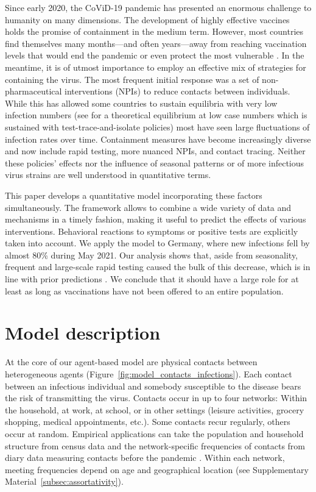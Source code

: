 Since early 2020, the CoViD-19 pandemic has presented an enormous challenge to humanity
on many dimensions. The development of highly effective vaccines holds the promise of
containment in the medium term. However, most countries find themselves many
months---and often years---away from reaching vaccination levels that would end the
pandemic or even protect the most vulnerable \citep{Mathieu2021}. In the meantime, it is
of utmost importance to employ an effective mix of strategies for containing the virus.
The most frequent initial response was a set of non-pharmaceutical interventions (NPIs)
to reduce contacts between individuals. While this has allowed some countries to sustain
equilibria with very low infection numbers (see \citet{Contreras2021} for a theoretical
equilibrium at low case numbers which is sustained with test-trace-and-isolate policies)
most have seen large fluctuations of infection rates over time. Containment measures
have become increasingly diverse and now include rapid testing, more nuanced NPIs, and
contact tracing. Neither these policies' effects nor the influence of seasonal patterns
or of more infectious virus strains are well understood in quantitative terms.

This paper develops a quantitative model incorporating these factors simultaneously. The
framework allows to combine a wide variety of data and mechanisms in a timely fashion,
making it useful to predict the effects of various interventions. Behavioral reactions
to symptoms or positive tests are explicitly taken into account. We apply the model to
Germany, where new infections fell by almost 80\% during May 2021. Our analysis shows
that, aside from seasonality, frequent and large-scale rapid testing caused the bulk of
this decrease, which is in line with prior predictions \citep{Mina2021}. We conclude
that it should have a large role for at least as long as vaccinations have not been
offered to an entire population.

\section{Model description}

At the core of our agent-based model \citep[][we review more literature in Supplementary
Material~\ref{sec:literature_review}]{Aleta2020,Hinch2021a} are physical contacts between
heterogeneous agents (Figure~\ref{fig:model_contacts_infections}). Each contact between
an infectious individual and somebody susceptible to the disease bears the risk of
transmitting the virus. Contacts occur in up to four networks: Within the household, at
work, at school, or in other settings (leisure activities, grocery shopping, medical
appointments, etc.). Some contacts recur regularly, others occur at random. Empirical
applications can take the population and household structure from census data and the
network-specific frequencies of contacts from diary data measuring contacts before the
pandemic \citep[e.g.][]{Mossong2008,Hoang2019}. Within each network, meeting frequencies
depend on age and geographical location (see Supplementary
Material~\ref{subsec:assortativity}).

